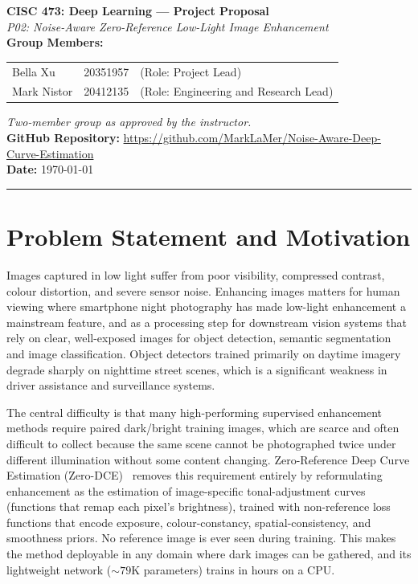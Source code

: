 \documentclass[11pt, letterpaper]{article}
\begin{document}
{\centering
  {\Large\textbf{CISC 473: Deep Learning --- Project Proposal}}\\[0.5em]
  {\large\textit{P02: Noise-Aware Zero-Reference Low-Light Image Enhancement}}\\[0.4em]
  \textbf{Group Members:}\\

\begin{tabular}{lcl}
{Bella Xu} &  20351957 & (Role: Project Lead)  \\
{Mark Nistor}& 20412135 & (Role: Engineering and Research Lead)  \\
\end{tabular}

  {\small\textit{Two-member group as approved by the instructor.}}\\[0.3em]
  \textbf{GitHub Repository:} \url{https://github.com/MarkLaMer/Noise-Aware-Deep-Curve-Estimation}\\[0.3em]
  \textbf{Date:} \today\\[0.4em]
  \rule{\linewidth}{0.4pt}
}

\section{Problem Statement and Motivation}

Images captured in low light suffer from poor visibility, compressed contrast, colour distortion, and severe sensor noise. Enhancing images matters for human viewing where smartphone night photography has made low-light enhancement a mainstream feature, and as a processing step for downstream vision systems that rely on clear, well-exposed images for object detection, semantic segmentation and image classification. Object detectors trained primarily on daytime imagery degrade sharply on nighttime street scenes, which is a significant weakness in driver assistance and surveillance systems.

The central difficulty is that many high-performing supervised enhancement methods require paired dark/bright training images, which are scarce and often difficult to collect because the same scene cannot be photographed twice under different illumination without some content changing. Zero-Reference Deep Curve Estimation (Zero-DCE)~\cite{guo2020zero} removes this requirement entirely by reformulating enhancement as the estimation of image-specific tonal-adjustment curves (functions that remap each pixel's brightness), trained with non-reference loss functions that encode exposure, colour-constancy, spatial-consistency, and smoothness priors. No reference image is ever seen during training. This makes the method deployable in any domain where dark images can be gathered, and its lightweight network ($\sim 79$K parameters) trains in hours on a CPU.
\end{document}
